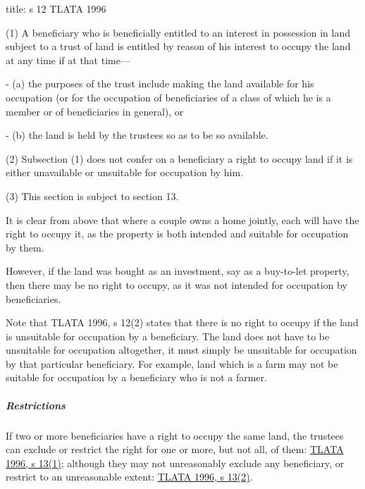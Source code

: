 \documentclass[
]{article}
\newenvironment{Shaded}{}{}
\newcommand{\NormalTok}[1]{#1}
\begin{document}
\begin{Shaded}
\begin{Highlighting}[]
\NormalTok{title: s 12 TLATA 1996}

\NormalTok{(1) A beneficiary who is beneficially entitled to an interest in possession in land subject to a trust of land is entitled by reason of his interest to occupy the land at any time if at that time—}

\NormalTok{{-} (a) the purposes of the trust include making the land available for his occupation (or for the occupation of beneficiaries of a class of which he is a member or of beneficiaries in general), or}

\NormalTok{{-} (b) the land is held by the trustees so as to be so available.}

\NormalTok{(2) Subsection (1) does not confer on a beneficiary a right to occupy land if it is either unavailable or unsuitable for occupation by him.}

\NormalTok{(3) This section is subject to section 13.}
\end{Highlighting}
\end{Shaded}

It is clear from above that where a couple owns a home jointly, each
will have the right to occupy it, as the property is both intended and
suitable for occupation by them.

However, if the land was bought as an investment, say as a buy-to-let
property, then there may be no right to occupy, as it was not intended
for occupation by beneficiaries.

Note that TLATA 1996, s 12(2) states that there is no right to occupy if
the land is unsuitable for occupation by a beneficiary. The land does
not have to be unsuitable for occupation altogether, it must simply be
unsuitable for occupation by that particular beneficiary. For example,
land which is a farm may not be suitable for occupation by a beneficiary
who is not a farmer.

\hypertarget{restrictions}{%
\subparagraph{Restrictions}\label{restrictions}}

If two or more beneficiaries have a right to occupy the same land, the
trustees can exclude or restrict the right for one or more, but not all,
of them:
\href{https://www.legislation.gov.uk/ukpga/1996/47/section/13}{TLATA
1996, s 13(1)}; although they may not unreasonably exclude any
beneficiary, or restrict to an unreasonable extent:
\href{https://www.legislation.gov.uk/ukpga/1996/47/section/13}{TLATA
1996, s 13(2)}.
\end{document}

